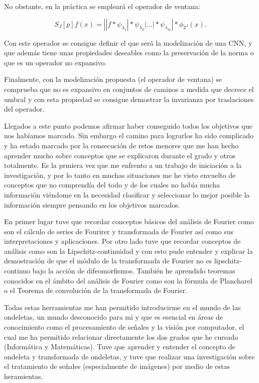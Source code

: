 \medskip

\noindent No obstante, en la práctica se empleará el operador de ventana:

\begin{equation}
  S_J[p]f(x)=\left| |f \ast \psi_{\lambda_1} | \ast \psi_{\lambda_2} | \ldots | \ast \psi_{\lambda_m} \right| \ast \phi_{2^J}(x).
\end{equation}

\noindent Con este operador se consigue definir el que será la modelización de una CNN, y que además tiene unas propiedades deseables como la preservación de la norma o que es un operador no expansivo.


\medskip

\noindent Finalmente, con la modelización propuesta (el operador de ventana) se comprueba que no es expansivo en conjuntos de caminos a medida que decrece el umbral y con esta propiedad se consigue demostrar la invarianza por traslaciones del operador.

\medskip

\noindent Llegados a este punto podemos afirmar haber conseguido todos los objetivos que nos habíamos marcado. Sin embargo el camino para lograrlos ha sido complicado y ha estado marcado por la consecución de retos menores que me han hecho aprender mucho sobre conceptos que se explicaron durante el grado y otros totalmente. Es la prmiera vez que me enfrento a un trabajo de iniciación a la investigación, y por lo tanto en muchas situaciones me he visto envuelto de conceptos que no comprendía del todo y de los cuales no había mucha información viéndome en la necesidad clasificar y seleccionar lo mejor posible la información siempre pensando en los objetivos marcados. 

\medskip

\noindent En primer lugar tuve que recordar conceptos básicos del análisis de Fourier como son el cálculo de series de Fourirer y transformada de Fourier así como sus interpretaciones y aplicaciones. Por otro lado tuve que recordar conceptos de análisis como son la Lipschitz-continuidad y con esto pude entender y explicar la demostración de que el módulo de la transformada de Fourier no es lipschitz-continuo bajo la acción de difeomorfismos. También he aprendido teoremas conocidos en el ámbito del análisis de Fourier como son la fórmula de Plancharel o el Teorema de convolución de la transformada de Fourier. 

\medskip

\noindent Todas estas herramientas me han permitido introducirme en el mundo de las ondeletas, un mundo desconocido para mi y que es esencial en áreas de conocimiento como el procesamiento de señales y la visión por computador, el cual me ha permitido relacionar directamente los dos grados que he cursado (Informática y Matemáticas). Tuve que aprender y entender el concepto de ondeleta y transformada de ondeletas, y tuve que realizar una investigación sobre el tratamiento de señales (especialmente de imágenes) por medio de estas heramientas.

